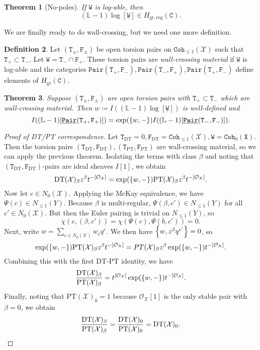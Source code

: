 \documentclass[leqno, openany]{memoir}
\newtheorem{thm}{Theorem}[section]
\theoremstyle{definition}
\newtheorem{defn}[thm]{Definition}
\theoremstyle{remark}
\theoremstyle{plain}
\theoremstyle{definition}
\theoremstyle{remark}
\renewcommand{\L}{\mathbb{L}}
\newcommand{\mc}[1]{\mathcal{#1}}
\newcommand{\mr}[1]{\mathrm{#1}}
\newcommand{\mt}[1]{\mathtt{#1}}
\newcommand{\ul}[1]{\underline{#1}}
\begin{document}
\begin{thm}[No-poles]
    If $\mt{W}$ is log-able, then
    \[ (\L - 1) \log [\mt{\ul{W}}] \in H_{\mr{gr,reg}}(\mt{C}). \]
\end{thm}

We are finally ready to do wall-crossing, but we need one more definition.

\begin{defn}
    Let $(\mt{T}_{\pm}, \mt{F}_{\pm})$ be open torsion pairs on $\mt{Coh}_{\leq 1}(\mc{X})$ such that $\mt{T}_+ \subset \mt{T}_-$. Let $\mt{W} = \mt{T}_- \cap \mt{F}_+$. These torsion pairs are \textit{wall-crossing material} if $\mt{W}$ is log-able and the categories $\mt{Pair(T_+, F_-)}, \mt{Pair(T_-, F_+)}, \mt{Pair(T_+,F_-)}$ define elements of $H_{\mr{gr}}(\mt{C})$.
\end{defn}

\begin{thm}
    Suppose $(\mt{T_{\pm}}, \mt{F_{\pm}})$ are open torsion pairs with $\mt{T_+} \subset \mt{T_-}$ which are wall-crossing material. Then $w \coloneqq I((\L-1) \log [\mt{\ul{W}}])$ is well-defined and
    \[ I((\L-1)[\mt{\ul{Pair}(T_+,F_+)}]) = \exp(\qty{w,-}) I((\L-1) [\mt{\ul{Pair}(T_-, F_-)}]). \]
\end{thm}

\begin{proof}[Proof of DT/PT correspondence]
    Let $\mt{T}_{\mr{DT}} = 0, \mt{F}_{\mr{DT}} = \mt{Coh}_{\leq 1}(\mc{X}), \mt{W} = \mt{Coh}_0(\mt{X})$. Then the torsion pairs $(\mt{T}_{\mr{DT}}, \mt{F}_{\mr{DT}}), (\mt{T}_{\mr{PT}}, \mt{F}_{\mr{PT}})$ are wall-crossing material, so we can apply the previous theorem. Isolating the terms with class $\beta$ and noting that $(\mt{T}_{\mr{DT}}, \mt{F}_{\mr{DT}})$-pairs are ideal sheaves $I[1]$, we obtain
    \[ \mr{DT}(\mc{X})_{\beta}z^{\beta} t^{-[\mc{O}_{\mc{X}}]} = \exp(\qty{w,-}) \mr{PT}(\mc{X})_{\beta} z^{\beta} t^{-[\mc{O}_{\mc{X}}]}. \]
    Now let $c \in N_0(\mc{X})$. Applying the McKay equivalence, we have $\Psi(c) \in N_{\leq 1}(Y)$. Because $\beta$ is multi-regular, $\Psi(\beta, c') \in N_{\leq 1}(Y)$ for all $c' \in N_0(\mc{X})$. But then the Euler pairing is trivial on $N_{\leq 1}(Y)$, so 
    \[ \chi(c, (\beta, c')) = \chi(\Psi(c), \Psi(b, c')) = 0. \]
    Next, write $w = \sum_{c \in N_0(\mc{X})} w_c q^c$. We then have $\qty{w, z^{\beta}q^{c'}} = 0$, so
    \[ \exp(\qty{w, -}) \mr{PT}(\mc{X})_{\beta} z^{\beta} t^{-[\mc{O}_{\mc{X}}]} = PT(\mc{X})_{\beta} z^{\beta} \exp(\qty{w,-}) t^{-[\mc{O}_{\mc{X}}]}. \]
    Combining this with the first DT-PT identity, we have 
    \[ \frac{\mr{DT}(\mc{X})_{\beta}}{\mr{PT}(\mc{X})_{\beta}} = t^{[\mc{O}_{\mc{X}}]} \exp(\qty{w,-}) t^{-[\mc{O}_{\mc{X}}]}. \]
    Finally, noting that $\mr{PT}(\mc{X})_0 = 1$ because $\mc{O}_{\mc{X}}[1]$ is the only stable pair with $\beta = 0$, we obtain
    \[ \frac{\mr{DT}(\mc{X})_{\beta}}{\mr{PT}(\mc{X})_{\beta}} = \frac{\mr{DT}(\mc{X})_{0}}{\mr{PT}(\mc{X})_{0}} = \mr{DT}(\mc{X})_{0}. \qedhere \]
\end{proof}
\end{document}
